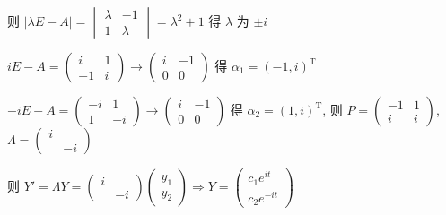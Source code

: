 \begin{enumerate}
			       则 \( |\lambda E - A| = \begin{vmatrix}
				       \lambda & -1      \\
				       1       & \lambda
			       \end{vmatrix} = \lambda^{2} + 1 \) 得 \(\lambda\) 为 \( \pm i \)

			       \( iE - A = \begin{pmatrix}
				       i  & 1 \\
				       -1 & i
			       \end{pmatrix} \rightarrow \begin{pmatrix}
				       i & -1 \\
				       0 & 0
			       \end{pmatrix} \) 得 \( \alpha_{1} = (-1, i)^{\mathrm{T}} \)

			       \( -iE - A = \begin{pmatrix}
				       -i & 1  \\
				       1  & -i
			       \end{pmatrix} \rightarrow \begin{pmatrix}
				       i & -1 \\
				       0 & 0
			       \end{pmatrix} \) 得 \( \alpha_{2} = (1, i)^{\mathrm{T}} \), 则 \( P = \begin{pmatrix}
				       -1 & 1 \\
				       i  & i
			       \end{pmatrix} \), \( \Lambda = \begin{pmatrix}
				       i &    \\
				         & -i
			       \end{pmatrix} \)

			       则 \( Y' = \Lambda Y = \begin{pmatrix}
				       i &    \\
				         & -i
			       \end{pmatrix}\begin{pmatrix}
				       y_{1} \\
				       y_{2}
			       \end{pmatrix} \Rightarrow Y = \begin{pmatrix}
				       c_{1}e^{it} \\
				       c_{2}e^{-it}
			       \end{pmatrix} \)


\end{enumerate}
